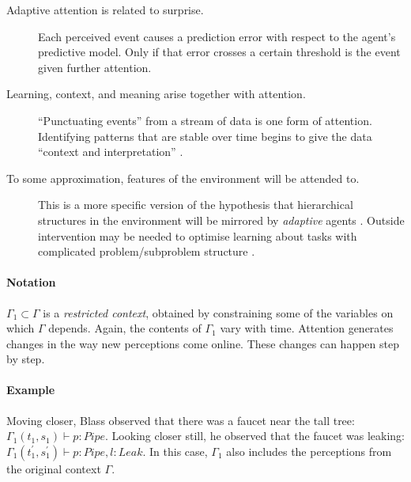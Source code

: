\begin{description}
\item[Adaptive attention is related to surprise.] Each perceived event causes a prediction error with respect to the agent's predictive model. Only if that error crosses a certain threshold is the event given further attention.
\item[Learning, context, and meaning arise together with attention.]
  ``Punctuating events'' \cite[p.~301]{bateson-logical-categories}
  from a stream of data is one form of attention.  Identifying
  patterns that are stable over time begins to give the data
  ``context and interpretation'' \cite{rowley2007wisdom}.
\item[To some approximation, features of the environment will be attended to.] This is a more specific version of the hypothesis
  that hierarchical structures in the environment will be mirrored by
  \emph{adaptive} agents \cite{simon1962architecture,simon1995near}.
  Outside intervention may be needed to optimise learning about tasks
  with complicated problem/subproblem structure
  \cite{goldenberg2004may}.
\end{description}

\paragraph{\textbf{\upshape Notation}}

$\Gamma_1 \subset \Gamma$ is a \emph{restricted context}, obtained by
constraining some of the variables on which $\Gamma$ depends.  Again,
the contents of $\Gamma_1$ vary with time.  Attention generates
changes in the way new perceptions come online.  These changes can
happen step by step.

\paragraph{\textbf{\upshape Example}} Moving closer, Blass observed that there was a faucet near the tall tree:
 $\Gamma_1(t_1,s_1)\vdash p:\mathit{Pipe}$.  Looking closer still,
he observed that the faucet was leaking:
$\Gamma_1(t_1^\prime,s_1^\prime)\vdash p:\mathit{Pipe}, l:\mathit{Leak}$.
In this case, $\Gamma_1$ also includes the perceptions from the original context $\Gamma$.

\begin{center}
\asterism
\end{center}

